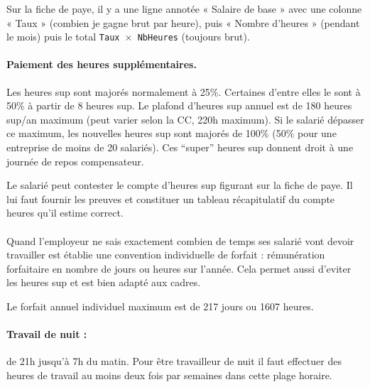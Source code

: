 Sur la fiche de paye, il y a une ligne annotée « Salaire de base » avec une colonne « Taux » (combien je gagne brut par heure), puis « Nombre d'heures » (pendant le mois) puis le total \texttt{Taux $\times$ NbHeures} (toujours brut).

\paragraph{Paiement des heures supplémentaires.}
Les heures sup sont majorés normalement à 25\%.
Certaines d’entre elles le sont à 50\% à partir de 8 heures sup.
Le plafond d’heures sup annuel est de 180 heures sup/an maximum (peut varier selon la CC, 220h maximum).
Si le salarié dépasser ce maximum, les nouvelles heures sup sont majorés de 100\% (50\% pour une entreprise de moins de 20 salariés).
Ces “super” heures sup donnent droit à une journée de repos compensateur.

Le salarié peut contester le compte d’heures sup figurant sur la fiche de paye.
Il lui faut fournir les preuves et constituer un tableau récapitulatif du compte heures qu’il estime correct.

\paragraph{}
Quand l’employeur ne sais exactement combien de temps ses salarié vont devoir travailler est établie une convention individuelle de forfait : rémunération forfaitaire en nombre de jours ou heures sur l’année. Cela permet aussi d’eviter les heures sup et est bien adapté aux cadres.

Le forfait annuel individuel maximum est de 217 jours ou 1607 heures.

\paragraph{Travail de nuit :} de 21h jusqu'à 7h du matin.
Pour être travailleur de nuit il faut effectuer des heures de travail au moins deux fois par semaines dans cette plage horaire.

